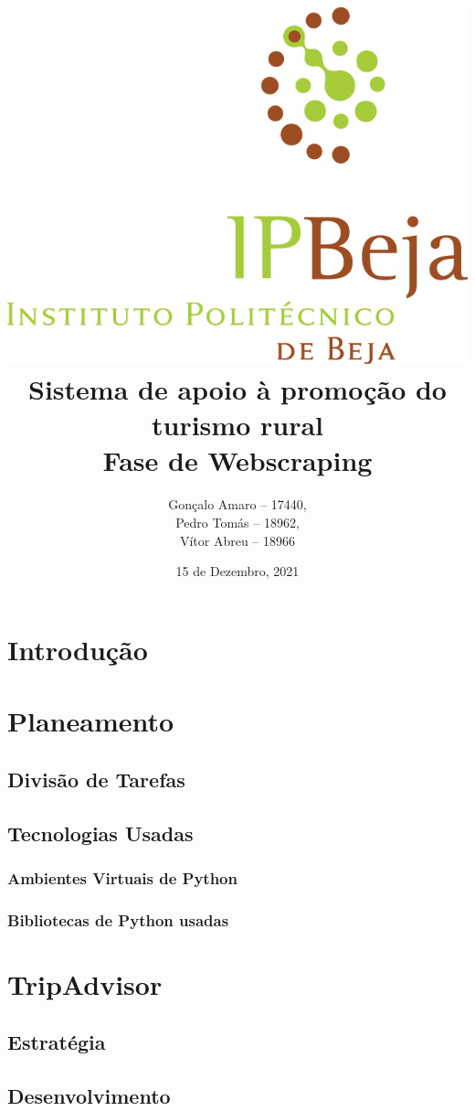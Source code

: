 \documentclass[a4paper,10pt]{article}
\title{\includegraphics[scale=0.5]{ipbeja_logo.png}\\[0.5cm]Sistema de apoio à promoção do turismo rural\\Fase de Webscraping} %
\author{Gonçalo Amaro -- 17440,\\ Pedro Tomás -- 18962,\\ Vítor Abreu -- 18966} %
\date{15 de Dezembro, 2021} %
\def\blankpage{%
      \clearpage%
      \thispagestyle{empty}%
      \addtocounter{page}{-1}%
      \null%
      \clearpage}
\begin{document}


\maketitle

\blankpage

{
  \hypersetup{linkcolor=black}
  \tableofcontents
}

\newpage

\section{Introdução}

\newpage

\section{Planeamento}

\subsection{Divisão de Tarefas}

\subsection{Tecnologias Usadas}

\subsubsection{Ambientes Virtuais de Python}

\subsubsection{Bibliotecas de Python usadas}

\newpage

\section{TripAdvisor}

\subsection{Estratégia}

\subsection{Desenvolvimento}
\end{document}

